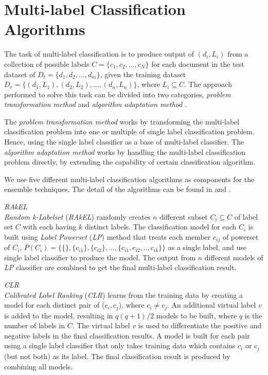 \section{Multi-label Classification Algorithms}
The task of multi-label classification is to produce output of $(d_{i}, L_{i})$ from a collection of possible labels $C = \{c_{1}, c_{2},...,c_{N}\}$ for each document in the test dataset of $D_{t} = \{d_{1}, d_{2},...,d_{m}\}$, given the training dataset $D_{r} =\{(d_{1},L_{1}),(d_{2},L_{2}),...,(d_{n},L_{n})\}$, where $L_{i} \subseteq C$. The approach performed to solve this task can be divided into two categories, \emph{problem transformation method} and \emph{algorithm adaptation method} \cite{MLCOverview}.

The \emph{problem transformation method} works by transforming the multi-label classification problem into one or multiple of single label classification problem. Hence, using the single label classifier as a base of multi-label classifier. The \emph{algorithm adaptation method} works by handling the multi-label classification problem directly, by extending the capability of certain classification algorithm.

We use five different multi-label classification algorithms as components for the ensemble techniques. The detail of the algorithms can be found in \cite{MLLChapter} and 	\cite{MLLSlides}.

\emph{RAkEL}\\
\emph{Random k-Labelset} (\emph{RAkEL}) randomly creates $n$ different subset $C_{i} \subseteq C$ of label set $C$ with each having $k$ distinct labels. The classification model for each $C_{i}$ is built using \emph{Label Powerset} (\emph{LP}) method that treats each member $c_{ij}$ of powerset of $C_{i}$, $P(C_{i}) = \{\{\},\{c_{i1}\},\{c_{i2}\},...,\{c_{i1},c_{i2},..,c_{ik}\}\}$ as a single label, and use single label classifier to produce the model. The output from $n$ different models of \emph{LP} classifier are combined to get the final multi-label classification result.

\emph{CLR}\\
\emph{Calibrated Label Ranking} (\emph{CLR}) learns from the training data by creating a model for each distinct pair of ($c_{i}, c_{j}$), where $c_{i}\ne c_{j}$. An additional virtual label $v$ is added to the model, resulting in $q(q+1)/2$ models to be built, where $q$ is the number of labels in $C$. The virtual label $v$ is used to differentiate the positive and negative labels in the final classification results. A model is built for each pair using a single label classifier that only takes training data which contains $c_{i}$ or $c_{j}$ (but not both) as its label. The final classification result is produced by combining all models.


